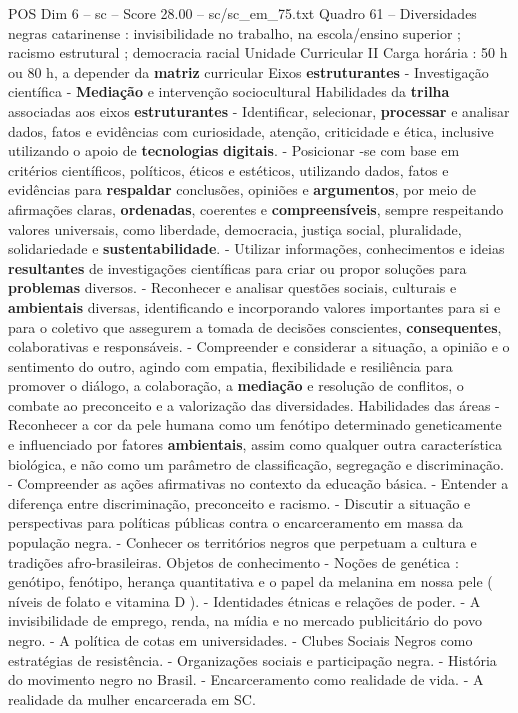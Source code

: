 \begin{textsample}{POS Dim 6 – sc – Score 28.00 – sc/sc\_em\_75.txt}
Quadro 61 – Diversidades negras catarinense : invisibilidade no trabalho, na escola/ensino superior ; racismo estrutural ; democracia racial Unidade Curricular II Carga horária : 50 h ou 80 h, a depender da \textbf{matriz} curricular Eixos \textbf{estruturantes} - Investigação científica - \textbf{Mediação} e intervenção sociocultural Habilidades da \textbf{trilha} associadas aos eixos \textbf{estruturantes} - Identificar, selecionar, \textbf{processar} e analisar dados, fatos e evidências com curiosidade, atenção, criticidade e ética, inclusive utilizando o apoio de \textbf{tecnologias} \textbf{digitais}. - Posicionar -se com base em critérios científicos, políticos, éticos e estéticos, utilizando dados, fatos e evidências para \textbf{respaldar} conclusões, opiniões e \textbf{argumentos}, por meio de afirmações claras, \textbf{ordenadas}, coerentes e \textbf{compreensíveis}, sempre respeitando valores universais, como liberdade, democracia, justiça social, pluralidade, solidariedade e \textbf{sustentabilidade}. - Utilizar informações, conhecimentos e ideias \textbf{resultantes} de investigações científicas para criar ou propor soluções para \textbf{problemas} diversos. - Reconhecer e analisar questões sociais, culturais e \textbf{ambientais} diversas, identificando e incorporando valores importantes para si e para o coletivo que assegurem a tomada de decisões conscientes, \textbf{consequentes}, colaborativas e responsáveis. - Compreender e considerar a situação, a opinião e o sentimento do outro, agindo com empatia, flexibilidade e resiliência para promover o diálogo, a colaboração, a \textbf{mediação} e resolução de conflitos, o combate ao preconceito e a valorização das diversidades.
Habilidades das áreas - Reconhecer a cor da pele humana como um fenótipo determinado geneticamente e influenciado por fatores \textbf{ambientais}, assim como qualquer outra característica biológica, e não como um parâmetro de classificação, segregação e discriminação. - Compreender as ações afirmativas no contexto da educação básica. - Entender a diferença entre discriminação, preconceito e racismo. - Discutir a situação e perspectivas para políticas públicas contra o encarceramento em massa da população negra. - Conhecer os territórios negros que perpetuam a cultura e tradições afro-brasileiras.
Objetos de conhecimento - Noções de genética : genótipo, fenótipo, herança quantitativa e o papel da melanina em nossa pele ( níveis de folato e vitamina D ). - Identidades étnicas e relações de poder. - A invisibilidade de emprego, renda, na mídia e no mercado publicitário do povo negro. - A política de cotas em universidades. - Clubes Sociais Negros como estratégias de resistência. - Organizações sociais e participação negra. - História do movimento negro no Brasil. - Encarceramento como realidade de vida. - A realidade da mulher encarcerada em SC.

\end{textsample}
